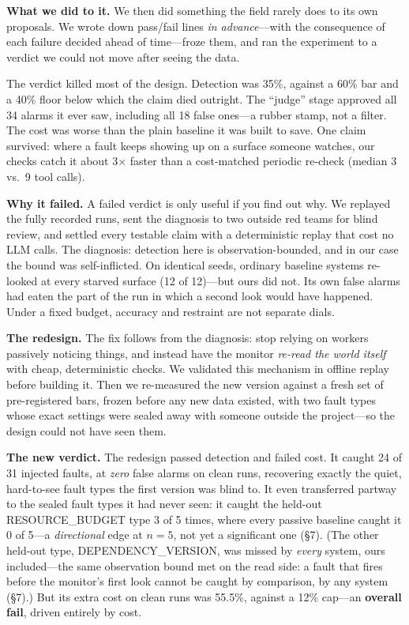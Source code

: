 \documentclass[acmsmall,screen]{acmart}
\begin{document}
\textbf{What we did to it.} We then did something the field rarely does to its
own proposals. We wrote down pass/fail lines \emph{in advance}---with the
consequence of each failure decided ahead of time---froze them, and ran the
experiment to a verdict we could not move after seeing the data.

The verdict killed most of the design. Detection was 35\%, against a 60\% bar
and a 40\% floor below which the claim died outright. The ``judge'' stage
approved all 34 alarms it ever saw, including all 18 false ones---a rubber
stamp, not a filter. The cost was worse than the plain baseline it was built to
save. One claim survived: where a fault keeps showing up on a surface someone
watches, our checks catch it about 3$\times$ faster than a cost-matched
periodic re-check (median 3 vs.\ 9 tool calls).

\textbf{Why it failed.} A failed verdict is only useful if you find out why. We
replayed the fully recorded runs, sent the diagnosis to two outside red teams
for blind review, and settled every testable claim with a deterministic replay
that cost no LLM calls. The diagnosis: detection here is observation-bounded,
and in our case the bound was self-inflicted. On identical seeds, ordinary
baseline systems re-looked at every starved surface (12 of 12)---but ours did
not. Its own false alarms had eaten the part of the run in which a second look
would have happened. Under a fixed budget, accuracy and restraint are not
separate dials.

\textbf{The redesign.} The fix follows from the diagnosis: stop relying on
workers passively noticing things, and instead have the monitor \emph{re-read
the world itself} with cheap, deterministic checks. We validated this mechanism
in offline replay before building it. Then we re-measured the new version
against a fresh set of pre-registered bars, frozen before any new data existed,
with two fault types whose exact settings were sealed away with someone outside
the project---so the design could not have seen them.

\textbf{The new verdict.} The redesign passed detection and failed cost. It
caught 24 of 31 injected faults, at \emph{zero} false alarms on clean runs,
recovering exactly the quiet, hard-to-see fault types the first version was
blind to. It even transferred partway to the sealed fault types it had never
seen: it caught the held-out RESOURCE\_BUDGET type 3 of 5 times, where every
passive baseline caught it 0 of 5---a \emph{directional} edge at $n=5$, not yet a
significant one (\S7). (The other held-out type, DEPENDENCY\_VERSION, was missed
by \emph{every} system, ours included---the same observation bound met on the
read side: a fault that fires before the monitor's first look cannot be caught by
comparison, by any system (\S7).) But its extra cost on clean runs was 55.5\%,
against a 12\% cap---an \textbf{overall fail}, driven entirely by cost.
\end{document}
